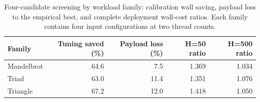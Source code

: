 \begin{table}[t]
\centering\small
\caption{Four-candidate screening by workload family: calibration wall saving, payload loss to the empirical best, and complete deployment wall-cost ratios. Each family contains four input configurations at two thread counts.}
\label{tab:family}
\begin{tabular}{lrrrr}
\hline
Family & Tuning saved (\%) & Payload loss (\%) & H=50 ratio & H=500 ratio\\
\hline
Mandelbrot & 64.6 & 7.5 & 1.369 & 1.034 \\
Triad & 63.0 & 11.4 & 1.351 & 1.076 \\
Triangle & 67.2 & 12.0 & 1.418 & 1.050 \\
\hline
\end{tabular}
\end{table}
